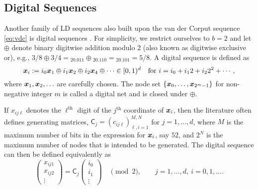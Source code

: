 \documentclass{svproc}
\begin{document}
\subsection{Digital Sequences} \label{sec:digital}

Another family of LD sequences also built upon the van der Corput sequence \eqref{eq:vdc} is digital sequences \cite{DicPil10a,Nie92}.  For simplicity, we restrict ourselves to $b = 2$ and let $\oplus$ denote binary digitwise addition modulo $2$ (also known as digitwise exclusive or), e.g., $3/8 \oplus 3/4 = {}_20.011 \oplus {}_20.110 = {}_20.101 = 5/8$.  A digital sequence is defined as
\begin{equation} \label{eq:digital}
	{\boldsymbol{x}}_i := i_0 {\boldsymbol{x}}_1 \oplus i_1 {\boldsymbol{x}}_2 \oplus i_2 {\boldsymbol{x}}_4 \oplus \cdots \in [0,1)^d \quad \text{for }
	i = i_0 + i_12 + i_2 2^2 + \cdots,
\end{equation}
where ${\boldsymbol{x}}_1, {\boldsymbol{x}}_2, \ldots$ are carefully chosen.  The node set $\{ {\boldsymbol{x}}_0, \ldots, {\boldsymbol{x}}_{2^m-1}\}$  for non-negative integer $m$ is called a digital net and is closed under $\oplus$.

If $x_{ij\ell}$ denotes the $\ell^{\text{th}}$ digit of the $j^{\text{th}}$ coordinate of ${\boldsymbol{x}}_i$, then the literature often defines generating matrices, $\mathsf{C}_j = (c_{ij\ell})_{\ell,i = 1}^{M,N}$ for $j = 1, \ldots, d$, where $M$ is the maximum number of bits in the expression for ${\boldsymbol{x}}_i$, say $52$, and $2^N$ is the maximum number of nodes that is intended to be generated.  The digital sequence can then be defined equivalently as
\begin{equation} \label{eq:digitalB}
	\begin{pmatrix} x_{ij1} \\ x_{ij2} \\ \vdots \end{pmatrix}
	= \mathsf{C}_j \begin{pmatrix} i_0 \\ i_1 \\ \vdots \end{pmatrix} \quad \pmod{2}, \qquad j = 1,\ldots, d, \ i = 0, 1, \ldots.
\end{equation}
\end{document}
